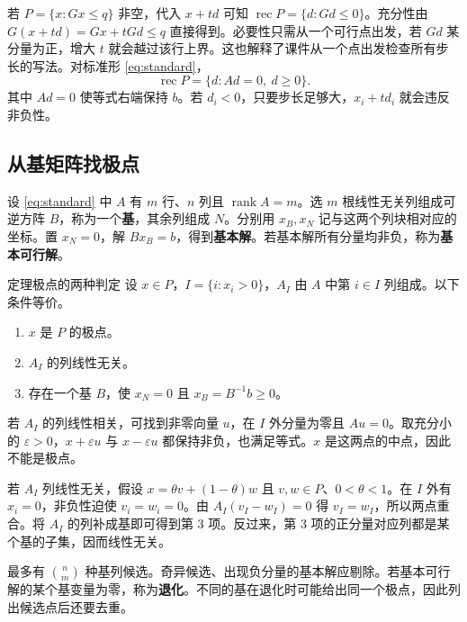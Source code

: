\documentclass[UTF8,fontset=none,zihao=-4,a4paper]{ctexart}
\newcommand{\term}[1]{\textbf{#1}}
\newcommand{\rank}{\operatorname{rank}}
\begin{document}
若 $P=\{x:Gx\le q\}$ 非空，代入 $x+td$ 可知 $\operatorname{rec}P=\{d:Gd\le0\}$。充分性由 $G(x+td)=Gx+tGd\le q$ 直接得到。必要性只需从一个可行点出发，若 $Gd$ 某分量为正，增大 $t$ 就会越过该行上界。这也解释了课件从一个点出发检查所有步长的写法。对标准形 \eqref{eq:standard}，
\begin{equation}\label{eq:recession}
\operatorname{rec}P=\{d:Ad=0,\ d\ge0\}.
\end{equation}
其中 $Ad=0$ 使等式右端保持 $b$。若 $d_i<0$，只要步长足够大，$x_i+td_i$ 就会违反非负性。

\subsection{从基矩阵找极点}
设 \eqref{eq:standard} 中 $A$ 有 $m$ 行、$n$ 列且 $\rank A=m$。选 $m$ 根线性无关列组成可逆方阵 $B$，称为一个\term{基}，其余列组成 $N$。分别用 $x_B,x_N$ 记与这两个列块相对应的坐标。置 $x_N=0$，解 $Bx_B=b$，得到\term{基本解}。若基本解所有分量均非负，称为\term{基本可行解}。

\begin{infobox}{定理\quad 极点的两种判定}
设 $x\in P$，$I=\{i:x_i>0\}$，$A_I$ 由 $A$ 中第 $i\in I$ 列组成。以下条件等价。
\begin{enumerate}[label=\arabic*.,leftmargin=2em]
\item $x$ 是 $P$ 的极点。
\item $A_I$ 的列线性无关。
\item 存在一个基 $B$，使 $x_N=0$ 且 $x_B=B^{-1}b\ge0$。
\end{enumerate}
\end{infobox}
若 $A_I$ 的列线性相关，可找到非零向量 $u$，在 $I$ 外分量为零且 $Au=0$。取充分小的 $\varepsilon>0$，$x+\varepsilon u$ 与 $x-\varepsilon u$ 都保持非负，也满足等式。$x$ 是这两点的中点，因此不能是极点。

若 $A_I$ 列线性无关，假设 $x=\theta v+(1-\theta)w$ 且 $v,w\in P$、$0<\theta<1$。在 $I$ 外有 $x_i=0$，非负性迫使 $v_i=w_i=0$。由 $A_I(v_I-w_I)=0$ 得 $v_I=w_I$，所以两点重合。将 $A_I$ 的列补成基即可得到第 3 项。反过来，第 3 项的正分量对应列都是某个基的子集，因而线性无关。

最多有 $\binom{n}{m}$ 种基列候选。奇异候选、出现负分量的基本解应剔除。若基本可行解的某个基变量为零，称为\term{退化}。不同的基在退化时可能给出同一个极点，因此列出候选点后还要去重。
\end{document}
